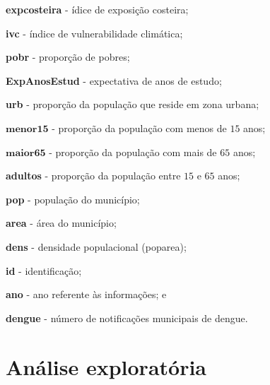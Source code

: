 \documentclass[12pt,a4paper]{article}\usepackage[]{graphicx}\usepackage[]{color}
\begin{document}
\noindent
\textbf{expcosteira} - ídice de exposição costeira;

\noindent
\textbf{ivc} - índice de vulnerabilidade climática;

\noindent
\textbf{pobr} - proporção de pobres;

\noindent
\textbf{ExpAnosEstud} - expectativa de anos de estudo;

\noindent
\textbf{urb} - proporção da população que reside em zona urbana;

\noindent
$\mathbf{menor15}$ - proporção da população com menos de $15$ anos;

\noindent
$\mathbf{maior65}$ - proporção da população com mais de $65$ anos;

\noindent
\textbf{adultos} - proporção da população entre $15$ e $65$ anos;

\noindent
\textbf{pop} - população do município;

\noindent
\textbf{area} - área do município;

\noindent
\textbf{dens} - densidade populacional (pop\/area);

\noindent
\textbf{id} - identificação;

\noindent
\textbf{ano} - ano referente às informações; e

\noindent
\textbf{dengue} - número de notificações municipais de dengue.


\newpage
\section{{\LARGE\textbf{Análise exploratória}}}

\end{document}
